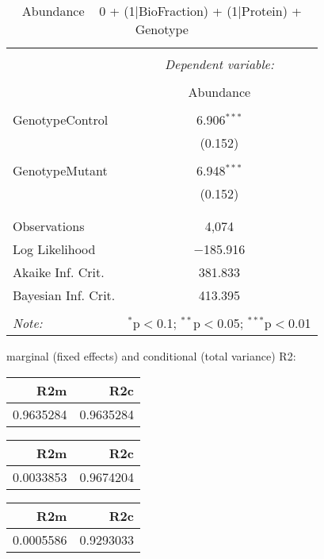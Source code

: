 \documentclass[11pt]{report}
\begin{document}
\begin{table}[!htbp] \centering 
  \caption{Abundance ~ 0 + (1|BioFraction) + (1|Protein) + Genotype} 
  \label{} 
\begin{tabular}{@{\extracolsep{5pt}}lc} 
\\[-1.8ex]\hline 
\hline \\[-1.8ex] 
 & \multicolumn{1}{c}{\textit{Dependent variable:}} \\ 
\cline{2-2} 
\\[-1.8ex] & Abundance \\ 
\hline \\[-1.8ex] 
 GenotypeControl & 6.906$^{***}$ \\ 
  & (0.152) \\ 
  & \\ 
 GenotypeMutant & 6.948$^{***}$ \\ 
  & (0.152) \\ 
  & \\ 
\hline \\[-1.8ex] 
Observations & 4,074 \\ 
Log Likelihood & $-$185.916 \\ 
Akaike Inf. Crit. & 381.833 \\ 
Bayesian Inf. Crit. & 413.395 \\ 
\hline 
\hline \\[-1.8ex] 
\textit{Note:}  & \multicolumn{1}{r}{$^{*}$p$<$0.1; $^{**}$p$<$0.05; $^{***}$p$<$0.01} \\ 
\end{tabular} 
\end{table} 
marginal (fixed effects) and conditional (total variance) R2:

\begin{tabular}{r|r}
\hline
R2m & R2c\\
\hline
0.9635284 & 0.9635284\\
\hline
\end{tabular}

\begin{tabular}{r|r}
\hline
R2m & R2c\\
\hline
0.0033853 & 0.9674204\\
\hline
\end{tabular}

\begin{tabular}{r|r}
\hline
R2m & R2c\\
\hline
0.0005586 & 0.9293033\\
\hline
\end{tabular}
\end{document}
